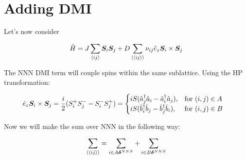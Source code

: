 \section{Adding DMI}

Let's now consider

\begin{equation}
\hat{H} = J \sum_{\langle i j \rangle} \boldsymbol{S}_i \boldsymbol{S}_j + D \sum_{\langle \langle i j \rangle \rangle} \nu_{ij}\hat{e}_z \boldsymbol{S}_i \times \boldsymbol{S}_j
\end{equation}

The NNN DMI term will couple spins within the same sublattice. Using the HP transformation:

\begin{equation}
\hat{e}_z \boldsymbol{S}_i \times \boldsymbol{S}_j = \frac{i}{2}(S_i^+S_j^--S_i^-S_j^+) = \begin{cases}
             iS(\hat{a}_j^\dagger\hat{a}_i-\hat{a}_i^\dagger\hat{a}_j),  & \text{for } (i,j) \in A \\
             iS(\hat{b}_i^\dagger\hat{b}_j-\hat{b}_j^\dagger\hat{b}_i),  & \text{for } (i,j) \in B
       \end{cases} \quad
\end{equation}

Now we will make the sum over NNN in the following way:

\begin{equation}
\sum_{\langle \langle i j \rangle \rangle} = \sum_{i\in A \boldsymbol{\delta}^{NNN}} +  \sum_{i\in B \boldsymbol{\delta}^{NNN}}
\end{equation}

